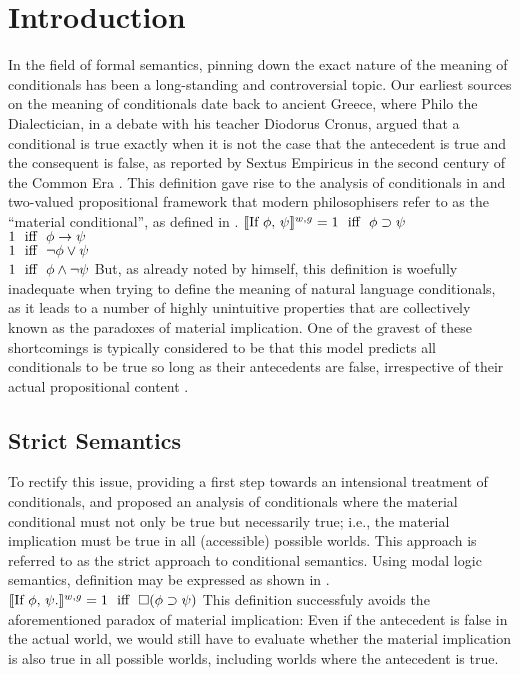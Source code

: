 \chapter{Introduction}
In the field of formal semantics, pinning down the exact nature of the meaning of conditionals has been a long-standing and controversial topic. Our earliest sources on the meaning of conditionals date back to ancient Greece, where Philo the Dialectician, in a debate with his teacher Diodorus Cronus, argued that a conditional is true exactly when it is not the case that the antecedent is true and the consequent is false, as reported by Sextus Empiricus in the second century of the Common Era \parencite{Kneale1962}. This definition gave rise to the analysis of conditionals in \textcite{Frege1879} and  two-valued propositional framework that modern philosophisers refer to as the \enquote{material conditional}, as defined in .
\pex
$\intension[w,g]{If $\phi$, $\psi$}=\textiff\phi\supset\psi$\\
$\textiff\phi\rightarrow\psi$\\
$\textiff\neg\phi\lor\psi$\\
$\textiff\phi\land\neg\psi$
\xe
But, as already noted by \textcite{Frege1879} himself, this definition is woefully inadequate when trying to define the meaning of natural language conditionals, as it leads to a number of highly unintuitive properties that are collectively known as the paradoxes of material implication. One of the gravest of these shortcomings is typically considered to be that this model predicts all conditionals to be true so long as their antecedents are false, irrespective of their actual propositional content \parencite{Lewis1912}.

\section{Strict Semantics}
To rectify this issue, providing a first step towards an intensional treatment of conditionals, \textcite[p.~33]{Peirce1896} and \textcite{Lewis1912,Lewis1914,Lewis1918} proposed an analysis of conditionals where the material conditional must not only be true but necessarily true; i.e., the material implication must be true in all (accessible) possible worlds. This approach is referred to as the strict approach to conditional semantics. Using  modal logic semantics,  definition may be expressed as shown in .
\ex\label{ex:strict-intro}
$\intension[w,g]{If $\phi$, $\psi$.}=\textiff\square(\phi\supset\psi)$
\xe
This definition successfuly avoids the aforementioned paradox of material implication: Even if the antecedent is false in the actual world, we would still have to evaluate whether the material implication is also true in all possible worlds, including worlds where the antecedent is true.


